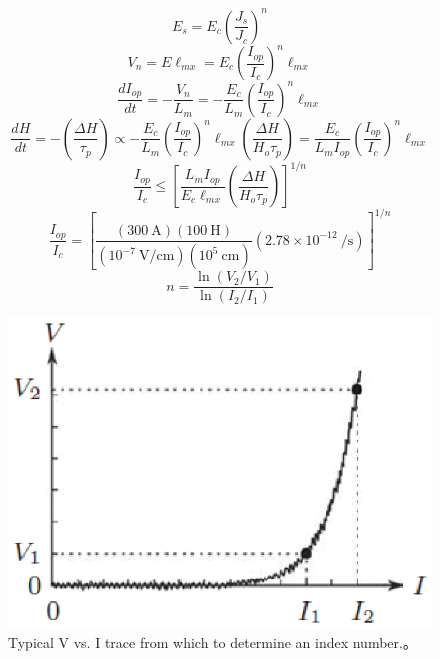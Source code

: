 \begin{equation}%
E_s=E_c\left(\frac{J_s}{J_c}\right)^n
\end{equation}
\begin{equation}%
V_n=E\ell_{mx}=E_c\left(\frac{I_{op}}{I_c}\right)^n\ell_{mx}
\end{equation}
\begin{equation}%
\frac{dI_{op}}{dt}=-\frac{V_n}{L_m}=-\frac{E_c}{L_m}\left(\frac{I_{op}}{I_c}\right)^n\ell_{mx}
\end{equation}
\begin{equation}%
\frac{dH}{dt}=-\left(\frac{\Delta H}{\tau_p}\right)\propto-\frac{E_c}{L_m}\left(\frac{I_{op}}{I_c}\right)^n\ell_{mx}
\left(\frac{\Delta H}{H_o\tau_p}\right)=\frac{E_c}{L_m I_{op}}\left(\frac{I_{op}}{I_c}\right)^n\ell_{mx}
\end{equation}
\begin{equation}%
\frac{I_{op}}{I_c}\leq\left[\frac{L_mI_{op}}{E_c\ell_{mx}}\left(\frac{\Delta H}{H_o\tau_p}\right)\right]^{1/n}
\end{equation}
\begin{equation}%
\frac{I_{op}}{I_c}=\left[\frac{(300\ \mathrm{A})(100\ \mathrm{H})}{(10^{-7}\ \mathrm{V/cm})(10^5\ \mathrm{cm})}(2.78\times 10^{-12}\ \mathrm{/s})\right]^{1/n}
\end{equation}
\begin{equation}%
n=\frac{\ln(V_2/V_1)}{\ln(I_2/I_1)}
\end{equation}



\begin{figure}[htbp]
	\centering
	\includegraphics[scale=0.7]{chpt7/figs/fig7.23.eps}
	\caption{Typical V vs. I trace from which to determine an index number.。}
\end{figure}


